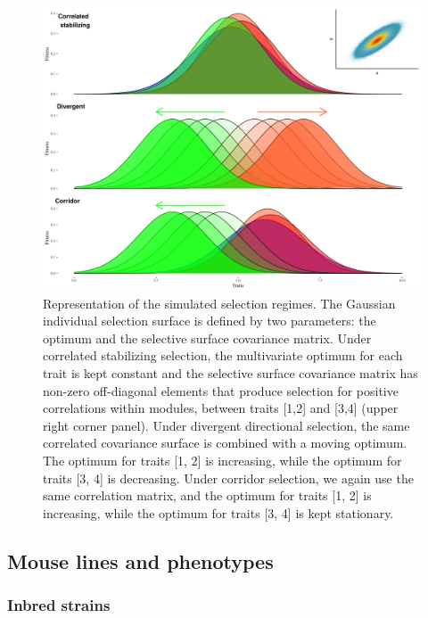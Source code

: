 \begin{refsection}
\begin{figure}
    \centering
    \includegraphics[width=\linewidth]{chapter_atchley/media/selection_types.png}
    \caption[Simulated selection regimes]{Representation of the simulated selection regimes. The Gaussian individual selection surface is defined by two parameters: the optimum and the selective surface covariance matrix. Under correlated stabilizing selection, the multivariate optimum for each trait is kept constant and the selective surface covariance matrix has non-zero off-diagonal elements that produce selection for positive correlations within modules, between traits [1,2] and [3,4] (upper right corner panel). Under divergent directional selection, the same correlated covariance surface is combined with a moving optimum. The optimum for traits [1, 2] is increasing, while the optimum for traits [3, 4] is decreasing. Under corridor selection, we again use the same correlation matrix, and the optimum for traits [1, 2] is increasing, while the optimum for traits [3, 4] is kept stationary.}
    \label{selectionregimes}
\end{figure}

\subsection{Mouse lines and phenotypes}

\subsubsection{Inbred strains} 
\label{ibs}


\end{refsection}

